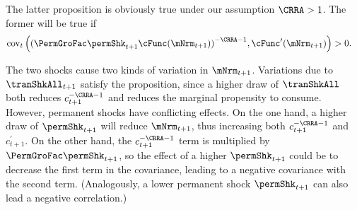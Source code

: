 \documentclass[\econtexRoot/BufferStockTheory]{subfiles}
\begin{document}
The latter proposition is obviously true under our assumption $\CRRA > 1$.  The former will be true if
\begin{align*}
  \mbox{cov}_{t}\left({(\PermGroFac \permShk_{t+1} \cFunc(\mNrm_{t+1}))}^{-\CRRA-1},\cFunc^{\prime}(\mNrm_{t+1}) \right)  & > 0 \nonumber.
\end{align*}

The two shocks cause two kinds of variation in $\mNrm_{t+1}$.  Variations due to $\tranShkAll_{t+1}$ satisfy the proposition, since a higher draw of $\tranShkAll$ both reduces $c_{t+1}^{-\CRRA-1}$ and reduces the marginal propensity to consume.  However, permanent shocks have conflicting effects.  On the one hand, a higher draw of $\permShk_{t+1}$ will reduce $\mNrm_{t+1}$, thus increasing both $c_{t+1}^{-\CRRA-1}$ and $c_{t+1}^{\prime}$.  On the other hand, the $c_{t+1}^{-\CRRA-1}$ term is multiplied by $\PermGroFac \permShk_{t+1}$, so the effect of a higher $\permShk_{t+1}$ could be to decrease the first term in the covariance, leading to a negative covariance with the second term.  (Analogously, a lower permanent shock $\permShk_{t+1}$ can also lead a negative correlation.)
\end{document}
